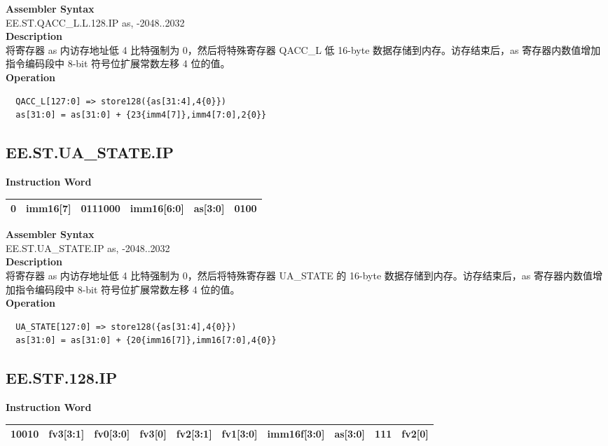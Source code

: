 \textbf{Assembler Syntax} \\
EE.ST.QACC\_L.L.128.IP as, -2048..2032 \\
\textbf{Description} \\
将寄存器 as 内访存地址低 4 比特强制为 0，然后将特殊寄存器 QACC\_L 低 16-byte 数据存储到内存。访存结束后，as 寄存器内数值增加指令编码段中 8-bit 符号位扩展常数左移 4 位的值。\\
\textbf{Operation}
\begin{lstlisting}
  QACC_L[127:0] => store128({as[31:4],4{0}})
  as[31:0] = as[31:0] + {23{imm4[7]},imm4[7:0],2{0}}
\end{lstlisting}

\clearpage
\subsection{EE.ST.UA\_STATE.IP}\label{instruction:EESTUASTATEIP}
\setlength\tabcolsep{6pt}
\textbf{Instruction Word} \\
\begin{tabular}{|c|c|c|c|c|c|}
	\hline
	0 & imm16[7] & 0111000 & imm16[6:0] & as[3:0] & 0100 \\
	\hline
\end{tabular}

\textbf{Assembler Syntax} \\
EE.ST.UA\_STATE.IP as, -2048..2032 \\
\textbf{Description} \\
将寄存器 as 内访存地址低 4 比特强制为 0，然后将特殊寄存器 UA\_STATE 的 16-byte 数据存储到内存。访存结束后，as 寄存器内数值增加指令编码段中 8-bit 符号位扩展常数左移 4 位的值。\\
\textbf{Operation}
\begin{lstlisting}
  UA_STATE[127:0] => store128({as[31:4],4{0}})
  as[31:0] = as[31:0] + {20{imm16[7]},imm16[7:0],4{0}}
\end{lstlisting}

\clearpage
\subsection{EE.STF.128.IP}\label{instruction:EESTF128IP}
\setlength\tabcolsep{6pt}
\textbf{Instruction Word} \\
\begin{tabular}{|c|c|c|c|c|c|c|c|c|c|}
	\hline
	10010 & fv3[3:1] & fv0[3:0] & fv3[0] & fv2[3:1] & fv1[3:0] & imm16f[3:0] & as[3:0] & 111 & fv2[0] \\
	\hline
\end{tabular}

